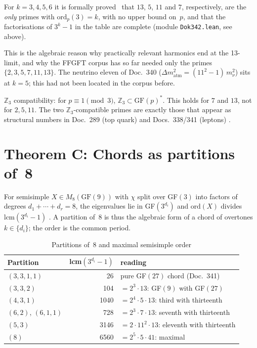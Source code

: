 For $k=3,4,5,6$ it is formally proved \LM\ that $13$, $5$, $11$ and $7$,
respectively, are the \emph{only} primes with $\text{ord}_p(3)=k$, with no upper
bound on~$p$, and that the factorisations of $3^k-1$ in the table are complete
(module \texttt{Dok342.lean}, see above).

This is the algebraic reason why practically relevant harmonics end at the
13-limit, and why the FFGFT corpus has so far needed only the primes
$\{2, 3, 5, 7, 11, 13\}$. The neutrino eleven of Doc.~340
($\Delta m^2_\text{atm} = (11^2 - 1)\, m_\nu^2$) sits at $k = 5$; this had not
been located in the corpus before.

$\mathbb{Z}_3$ compatibility: for $p \equiv 1 \pmod 3$, $\mathbb{Z}_3 \subset \text{GF}(p)^*$.
This holds for $7$ and $13$, not for $2, 5, 11$. The two $\mathbb{Z}_3$-compatible
primes are exactly those that appear as structural numbers in Doc.~289 (top quark)
and Docs.~338/341 (leptons) \BM.

\section{Theorem C: Chords as partitions of~8}

For semisimple $X \in M_8(\text{GF}(9))$ with $\chi$ split over GF$(3)$ into factors
of degrees $d_1 + \cdots + d_r = 8$, the eigenvalues lie in GF$(3^{d_i})$ and
$\text{ord}(X)$ divides $\text{lcm}(3^{d_i} - 1)$ \BM. A partition of~8 is thus the
algebraic form of a chord of overtones $k \in \{d_i\}$; the order is the common period.

\begin{table}[H]
\centering
\caption{Partitions of~8 and maximal semisimple order}
\begin{tabular}{lrl}
\toprule
Partition & lcm$(3^{d_i}{-}1)$ & reading \\
\midrule
$(3,3,1,1)$ & 26 & pure GF$(27)$ chord (Doc.~341) \\
$(3,3,2)$ & 104 & $= 2^3 \cdot 13$: GF$(9)$ with GF$(27)$ \\
$(4,3,1)$ & 1040 & $= 2^4 \cdot 5 \cdot 13$: third with thirteenth \\
$(6,2)$, $(6,1,1)$ & 728 & $= 2^3 \cdot 7 \cdot 13$: seventh with thirteenth \\
$(5,3)$ & 3146 & $= 2 \cdot 11^2 \cdot 13$: eleventh with thirteenth \\
$(8)$ & 6560 & $= 2^5 \cdot 5 \cdot 41$: maximal \\
\bottomrule
\end{tabular}
\end{table}

